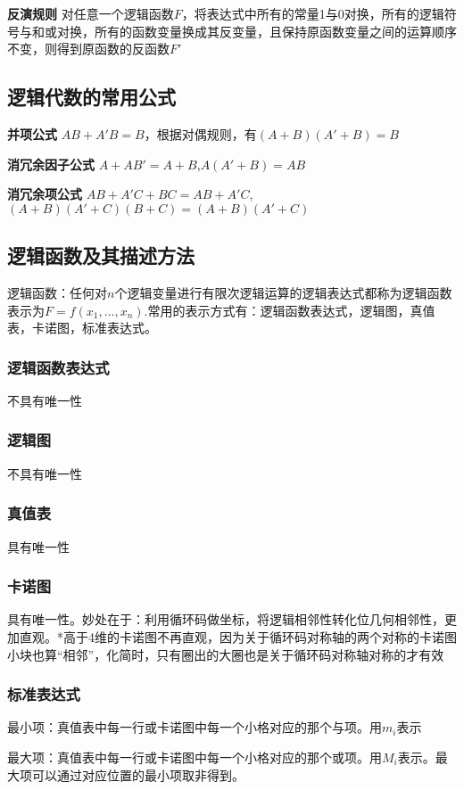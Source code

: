 \documentclass{ctexart}
\newcommand*{\noindbf}[1]{{\noindent \bf{#1} \qquad}}
\begin{document}
\noindbf{反演规则}对任意一个逻辑函数$F$，将表达式中所有的常量1与0对换，所有的逻辑符号与和或对换，所有的函数变量换成其反变量，且保持原函数变量之间的运算顺序不变，则得到原函数的反函数$F'$
{\color{red}{注意区分对偶和反演！只有后者要将函数变量换成其反变量！还要注意反变量与非运算的区别！}}
\subsection{逻辑代数的常用公式}
\noindbf{并项公式}$AB+A'B=B$，根据对偶规则，有$(A+B)(A'+B)=B$

\noindbf{消冗余因子公式}$A+AB'=A+B$,$A(A'+B)=AB$

\noindbf{消冗余项公式}$AB+A'C+BC=AB+A'C$,$(A+B)(A'+C)(B+C)=(A+B)(A'+C)$
\subsection{逻辑函数及其描述方法}
逻辑函数：任何对$n$个逻辑变量进行有限次逻辑运算的逻辑表达式都称为逻辑函数表示为$F=f(x_1,...,x_n)$.常用的表示方式有：逻辑函数表达式，逻辑图，真值表，卡诺图，标准表达式。
\subsubsection{逻辑函数表达式}不具有唯一性
\subsubsection{逻辑图}不具有唯一性
\subsubsection{真值表}具有唯一性
\subsubsection{卡诺图}具有唯一性。妙处在于：利用循环码做坐标，将逻辑相邻性转化位几何相邻性，更加直观。*高于4维的卡诺图不再直观，因为关于循环码对称轴的两个对称的卡诺图小块也算“相邻”，化简时，只有圈出的大圈也是关于循环码对称轴对称的才有效
\subsubsection{标准表达式}
最小项：真值表中每一行或卡诺图中每一个小格对应的那个与项。用$m_i$表示

最大项：真值表中每一行或卡诺图中每一个小格对应的那个或项。用$M_i$表示。最大项可以通过对应位置的最小项取非得到。{\color{red}{注意：用卡诺图写最大项时是反的，101对应$A'+B+C'$}}
\end{document}
